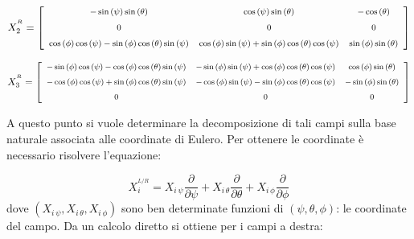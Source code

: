 \documentclass[11pt]{report}
\theoremstyle{plain}
\theoremstyle{definition}
\theoremstyle{remark}
\begin{document}
\begin{displaymath}\footnotesize
X_{2}^{^{R}} = \left[ \begin {array}{ccc} -\sin \left( \psi \right) \sin \left( \theta \right) &\cos \left( \psi \right) \sin \left( \theta \right) &-\cos \left( \theta \right) \\ \noalign{\medskip}0&0&0\\ \noalign{\medskip}\cos \left( \phi \right) \cos \left( \psi \right) -\sin \left( \phi \right) \cos \left( \theta \right) \sin \left( \psi \right) &\cos \left( \phi \right) \sin \left( \psi \right) +\sin \left( \phi \right) \cos \left( \theta \right) \cos \left( \psi \right) &\sin \left( \phi \right) \sin \left( \theta \right) \end {array} \right]
\end{displaymath}

\begin{displaymath}\footnotesize
X_{3}^{^{R}} = \left[ \begin {array}{ccc} -\sin \left( \phi \right) \cos \left( \psi \right) -\cos \left( \phi \right) \cos \left( \theta \right) \sin \left( \psi \right) &-\sin \left( \phi \right) \sin \left( \psi \right) +\cos \left( \phi \right) \cos \left( \theta \right) \cos \left( \psi \right) &\cos \left( \phi \right) \sin \left( \theta \right) \\ \noalign{\medskip}-\cos \left( \phi \right) \cos \left( \psi \right) +\sin \left( \phi \right) \cos \left( \theta \right) \sin \left( \psi \right) &-\cos \left( \phi \right) \sin \left( \psi \right) -\sin \left( \phi \right) \cos \left( \theta \right) \cos \left( \psi \right) &-\sin \left( \phi \right) \sin \left( \theta \right) \\ \noalign{\medskip}0&0&0\end {array} \right]
\end{displaymath}

A questo punto si vuole determinare la decomposizione di tali campi sulla base naturale associata alle coordinate di Eulero. Per ottenere le coordinate è necessario risolvere l'equazione:

\begin{displaymath}
X_{i}^{^{L/R}} = X_{i \, \psi}\dfrac{\partial}{\partial \psi} + X_{i \, \theta}\dfrac{\partial}{\partial \theta} + X_{i \, \phi}\dfrac{\partial}{\partial \phi}
\end{displaymath}
dove $(X_{i \, \psi} , X_{i \, \theta} , X_{i \, \phi} ) $ sono ben determinate funzioni di $(\psi, \theta, \phi)$: le coordinate del campo.
Da un calcolo diretto si ottiene per i campi a destra:
\end{document}
